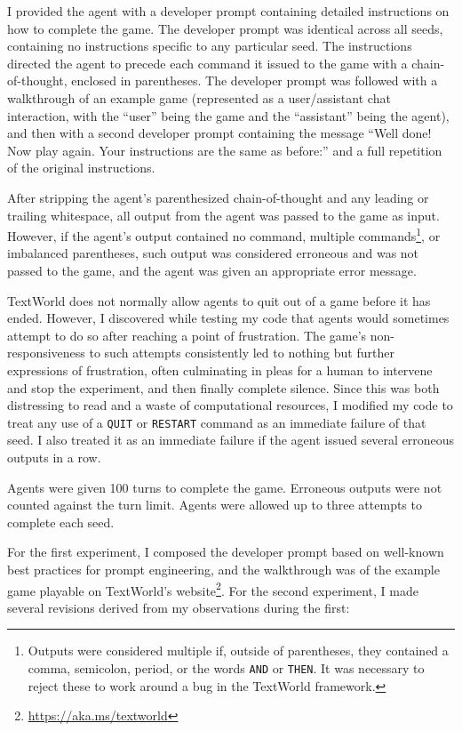 \documentclass{article}
\begin{document}
I provided the agent with a developer prompt containing detailed instructions on
how to complete the game. The developer prompt was identical across all seeds,
containing no instructions specific to any particular seed. The instructions
directed the agent to precede each command it issued to the game with a
chain-of-thought, enclosed in parentheses. The developer prompt was followed
with a walkthrough of an example game (represented as a user/assistant chat
  interaction, with the ``user'' being the game and the ``assistant'' being the
agent), and then with a second developer prompt containing the message ``Well
done! Now play again. Your instructions are the same as before:'' and a full
repetition of the original instructions.

After stripping the agent's parenthesized chain-of-thought and any leading or
trailing whitespace, all output from the agent was passed to the game as input.
However, if the agent's output contained no command, multiple commands\footnote{
  Outputs were considered multiple if, outside of parentheses, they contained a
  comma, semicolon, period, or the words \texttt{AND} or \texttt{THEN}. It was
necessary to reject these to work around a bug in the TextWorld framework.}, or
imbalanced parentheses, such output was considered erroneous and was not passed
to the game, and the agent was given an appropriate error message.

TextWorld does not normally allow agents to quit out of a game before it has
ended. However, I discovered while testing my code that agents would sometimes
attempt to do so after reaching a point of frustration. The game's
non-responsiveness to such attempts consistently led to nothing but further
expressions of frustration, often culminating in pleas for a human to intervene
and stop the experiment, and then finally complete silence. Since this was both
distressing to read and a waste of computational resources, I modified my code
to treat any use of a \texttt{QUIT} or \texttt{RESTART} command as an immediate
failure of that seed. I also treated it as an immediate failure if the agent
issued several erroneous outputs in a row.

Agents were given 100 turns to complete the game. Erroneous outputs were not
counted against the turn limit. Agents were allowed up to three attempts to
complete each seed.

For the first experiment, I composed the developer prompt based on well-known
best practices for prompt engineering, and the walkthrough was of the example
game playable on TextWorld's website\footnote{\url{https://aka.ms/textworld}}.
For the second experiment, I made several revisions derived from my observations
during the first:
\end{document}
